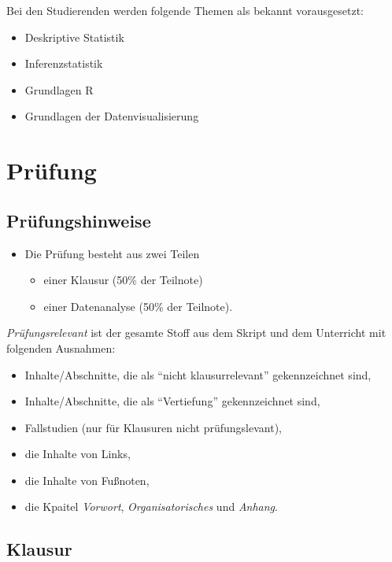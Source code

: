 \documentclass[12pt,ngerman,]{book}
\providecommand{\tightlist}{%
  \setlength{\itemsep}{0pt}\setlength{\parskip}{0pt}}
\begin{document}
Bei den Studierenden werden folgende Themen als bekannt vorausgesetzt:

\begin{itemize}
\tightlist
\item
  Deskriptive Statistik
\item
  Inferenzstatistik
\item
  Grundlagen R
\item
  Grundlagen der Datenvisualisierung
\end{itemize}

\section{Prüfung}\label{prufung}

\subsection{Prüfungshinweise}\label{prufungshinweise}

\begin{itemize}
\tightlist
\item
  Die Prüfung besteht aus zwei Teilen

  \begin{itemize}
  \tightlist
  \item
    einer Klausur (50\% der Teilnote)
  \item
    einer Datenanalyse (50\% der Teilnote).
  \end{itemize}
\end{itemize}

\emph{Prüfungsrelevant} ist der gesamte Stoff aus dem Skript und dem
Unterricht mit folgenden Ausnahmen:

\begin{itemize}
\tightlist
\item
  Inhalte/Abschnitte, die als ``nicht klausurrelevant'' gekennzeichnet
  sind,
\item
  Inhalte/Abschnitte, die als ``Vertiefung'' gekennzeichnet sind,
\item
  Fallstudien (nur für Klausuren nicht prüfungslevant),
\item
  die Inhalte von Links,
\item
  die Inhalte von Fußnoten,
\item
  die Kpaitel \emph{Vorwort}, \emph{Organisatorisches} und
  \emph{Anhang}.
\end{itemize}

\subsection{Klausur}\label{klausur}
\end{document}
